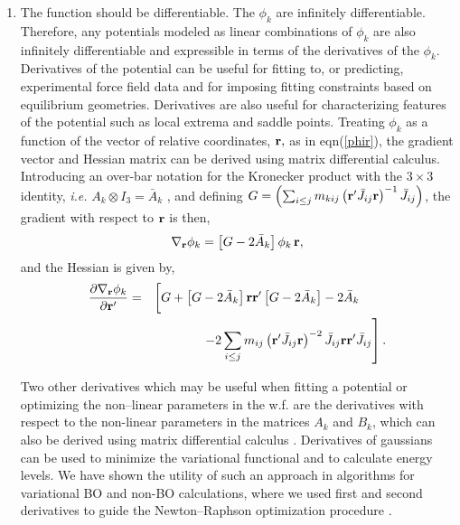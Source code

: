 \begin{enumerate}
\item  
The function should be differentiable.
The $\phi _k$ are infinitely differentiable. Therefore, any potentials
modeled as linear combinations of $\phi _k$ are also infinitely
differentiable and expressible in terms of the derivatives of the $\phi _k$.
Derivatives of the potential can be useful for fitting to, or predicting,
experimental force field data and for imposing fitting constraints based on
equilibrium geometries. Derivatives are also useful for characterizing
features of the potential such as local extrema and saddle points. Treating $%
\phi_k$ as a function of the vector of relative coordinates, ${\bf r,}$
as in eqn(\ref{phir}), the gradient vector and Hessian matrix can be derived
using matrix differential calculus\cite{Kinghorn95a}. Introducing an
over-bar notation for the Kronecker product with the $3\times 3$ identity, 
{\it i.e.} $A_k\otimes I_3=\bar{A}_k\,\,$, and defining $G=\left(
\sum_{i\leq j}m_{kij}\left( {\bf r}^{\prime }\bar{J}_{ij}{\bf r}%
\right) ^{-1}\bar{J}_{ij}\right) $, the gradient with respect to ${\bf r}
$ is then, 
\begin{equation}
\nabla _{{\bf r}}\phi _k=\left[ G-2\bar{A}_k\right] \phi _k\,{\bf r,}
\end{equation}
and the Hessian is given by, 
\begin{eqnarray}
\frac{\partial \nabla _{{\bf r}}\phi _k}{\partial {\bf r}^{\prime }}
&=&\left[ G+\left[ G-2\bar{A}_k\right] {\bf rr}^{\prime }\left[ G-2\bar{A}%
_k\right] -2\bar{A}_k\mathstrut \strut 
\begin{array}{ll}
&  \\ 
& 
\end{array}
\right.   \nonumber \\
&&\left. -2\sum_{i\leq j}m_{ij}\left( {\bf r}^{\prime }\bar{J}_{ij}%
{\bf r}\right) ^{-2}\bar{J}_{ij}{\bf rr}^{\prime }\bar{J}_{ij}\right] .
\end{eqnarray}

Two other derivatives which may be useful when fitting a potential 
or optimizing the non--linear parameters in the w.f.
are the
derivatives with respect to the non-linear parameters in the matrices $A_k$
and $B_k$, which can also be derived using matrix differential calculus
\cite{Kinghorn95a}. 
Derivatives of gaussians can be used to 
minimize the variational functional and to calculate
energy levels. We have shown the utility of such an approach
in algorithms for variational BO and non-BO calculations,
where we used first and second derivatives to guide
the Newton--Raphson optimization procedure
\cite{A8,A14,A21,A38,kozlowski92b}. 


\end{enumerate}
